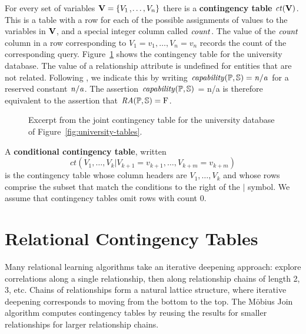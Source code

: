 \documentclass{acm_proc_article-sp}
\newcommand{\ct}{\mathit{ct}}
\begin{document}
For every set of variables $\set{V} = \{\V_{1}$,$\ldots,\V_{n} \}$ there is a \textbf{contingency table} $\ct(\set{V})$. %
This is a table with a row for each of the possible assignments of values to the variables in $\set{V}$, and a special integer column called $\qcount$. 
The value of the $\qcount$ column in a row 
corresponding to $V_{1} = v_{1},\ldots,V_{n} = v_{n}$ records the count of the 
corresponding query. 
Figure~\ref{fig:ct} shows the contingency table for the university database. 
The value of a relationship attribute is undefined for entities that are not related.
Following \cite{Russell2010}, 
we indicate this by writing 
$\it{capability(\P,\S)} = n/a $ for a reserved constant $\it{n/a}$. 
The assertion $\it{capability(\P,\S)}$ = n/a is therefore equivalent to the assertion that $\ra(\P,\S) = \false$.
\begin{figure}[htbp]
\begin{center}
\caption{Excerpt from the joint contingency table for the university database of Figure~\ref{fig:university-tables}. 
\label{fig:ct}}
\end{center}
\end{figure}
A \textbf{conditional contingency table}, written $$\ct(V_{1},\ldots,V_{k}|V_{k+1} = v_{k+1},\ldots, V_{k+m} = v_{k+m})$$
is the contingency table whose column headers are $V_{1},\ldots,V_{k}$ and whose rows comprise the subset that match the conditions to the right of the $\vert$ symbol.  %
We assume that contingency tables omit rows with count 0.


\section{Relational  Contingency Tables}
Many relational learning algorithms take an iterative deepening approach: 
explore correlations along a single relationship, then along relationship chains of length 2, 3, etc. 
Chains of relationships form a natural lattice structure, where iterative deepening corresponds to moving from the bottom to the top. 
The M\"obius Join algorithm computes contingency tables by reusing the results for smaller relationships for larger relationship chains. 
\end{document}
